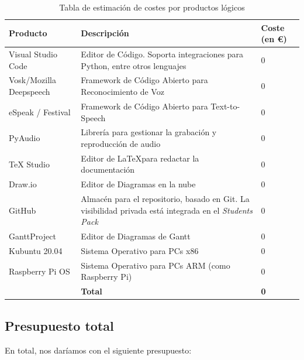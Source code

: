 \begin{center}
	\begin{table}[H]
		\centering
		\begin{tabularx}{\textwidth}{|l|X|X|}
			\hline
			{\cellcolor{lightblue}}\textbf{Producto} & {\cellcolor{lightblue}}\textbf{Descripción} & {\cellcolor{lightblue}}\textbf{Coste (en €)} \\
			\hline
			Visual Studio Code & Editor de Código. Soporta integraciones para Python, entre otros lenguajes & 0 \\
			\hline
			Vosk/Mozilla Deepspeech & Framework de Código Abierto para Reconocimiento de Voz & 0 \\
			\hline
			eSpeak / Festival & Framework de Código Abierto para Text-to-Speech & 0 \\
			\hline
			PyAudio & Librería para gestionar la grabación y reproducción de audio & 0 \\
			\hline
			TeX Studio & Editor de \LaTeX  para redactar la documentación & 0 \\
			\hline
			Draw.io & Editor de Diagramas en la nube & 0 \\
			\hline
			GitHub & Almacén para el repositorio, basado en Git. La visibilidad privada está integrada en el \textit{Students Pack} & 0 \\
			\hline
			GanttProject & Editor de Diagramas de Gantt & 0 \\
			\hline
			Kubuntu 20.04 & Sistema Operativo para PCs x86 & 0 \\
			\hline
			Raspberry Pi OS  & Sistema Operativo para PCs ARM (como Raspberry Pi) & 0 \\
			\hline
			& \textbf{Total} & \textbf{0} \\
			\hline
		\end{tabularx}
		\caption{Tabla de estimación de costes por productos lógicos}
	\end{table}
\end{center}


\subsection{Presupuesto total}
En total, nos daríamos con el siguiente presupuesto:


